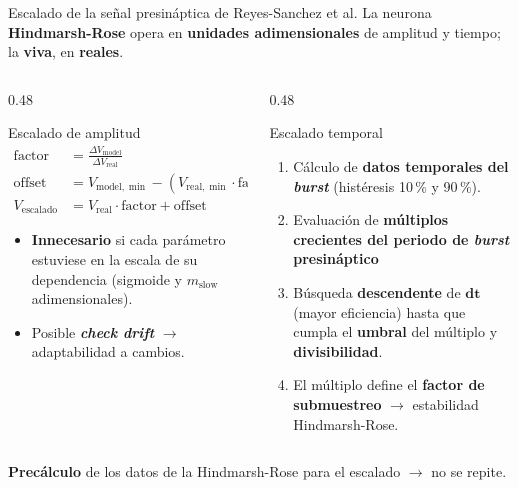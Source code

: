 \documentclass[10pt, aspectratio=169]{beamer}
\begin{document}
\begin{frame}{Escalado de la señal presináptica de Reyes-Sanchez et al.}
    \small
    La neurona \textbf{Hindmarsh-Rose} opera en \textbf{unidades adimensionales} de amplitud y tiempo; la \textbf{viva}, en \textbf{reales}.
    \vspace{-1em}
    \begin{columns}[t]
        \begin{column}{0.48\textwidth}
            \begin{block}{Escalado de amplitud}
                \vspace{-1em}
                \begin{equation*}
                    \begin{aligned}
                        \mathrm{factor}       & = \frac{\Delta V_{\mathrm{model}}}{\Delta V_{\mathrm{real}}}               \\
                        \mathrm{offset}       & = V_{\mathrm{model,}\min} - (V_{\mathrm{real,}\min} \cdot \mathrm{factor}) \\
                        V_{\mathrm{escalado}} & = V_{\mathrm{real}} \cdot \mathrm{factor} + \mathrm{offset}
                    \end{aligned}
                \end{equation*}
                \begin{itemize}
                    \item \textbf{Innecesario} si cada parámetro estuviese en la escala de su dependencia (sigmoide y $m_{\mathrm{slow}}$ adimensionales).
                    \item Posible \textbf{\textit{check drift}} $\to$ adaptabilidad a cambios.
                \end{itemize}
            \end{block}
        \end{column}
        \begin{column}{0.48\textwidth}
            \begin{block}{Escalado temporal}
                \begin{enumerate}
                    \item Cálculo de \textbf{datos temporales del \textit{burst}} (histéresis 10\,\% y 90\,\%).
                    \item Evaluación de \textbf{múltiplos crecientes del periodo de \textit{burst} presináptico}
                    \item Búsqueda \textbf{descendente} de $\boldsymbol{dt}$ (mayor eficiencia) hasta que cumpla el \textbf{umbral} del múltiplo y \textbf{divisibilidad}.
                    \item El múltiplo define el \textbf{factor de submuestreo} $\to$ estabilidad Hindmarsh-Rose.
                \end{enumerate}
            \end{block}
        \end{column}
    \end{columns}
    \vspace{1em}
    \textbf{Precálculo} de los datos de la Hindmarsh-Rose para el escalado $\to$ no se repite.
\end{frame}
\end{document}
